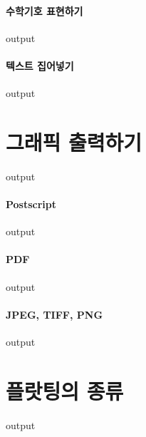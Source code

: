 \documentclass{book}
\begin{document}
\paragraph{수학기호 표현하기}
\begin{Schunk}
\begin{Soutput}
output
\end{Soutput}
\end{Schunk}
\paragraph{텍스트 집어넣기}
\begin{Schunk}
\begin{Soutput}
output
\end{Soutput}
\end{Schunk}

\section{그래픽 출력하기}
\begin{Schunk}
\begin{Soutput}
output
\end{Soutput}
\end{Schunk}
\paragraph{Postscript}
\begin{Schunk}
\begin{Soutput}
output
\end{Soutput}
\end{Schunk}
\paragraph{PDF}
\begin{Schunk}
\begin{Soutput}
output
\end{Soutput}
\end{Schunk}
\paragraph{JPEG, TIFF, PNG}
\begin{Schunk}
\begin{Soutput}
output
\end{Soutput}
\end{Schunk}

\section{플랏팅의 종류}
\begin{Schunk}
\begin{Soutput}
output
\end{Soutput}
\end{Schunk}
\end{document}
